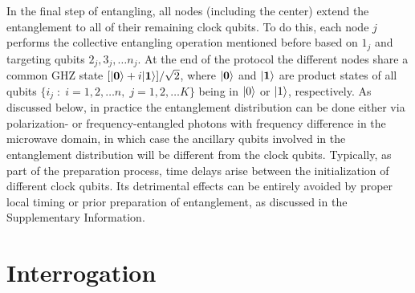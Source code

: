 In the final step of entangling, all nodes (including the center) extend the
entanglement to all of their remaining clock qubits. To do this, each node $j$
performs the collective entangling operation mentioned before based on
$1_j$ and targeting qubits $2_j, 3_j, \dots n_j$.  At the end of the protocol the different nodes share a common
GHZ state $[| \mathbf{0} \rangle + i| \mathbf{1} \rangle]/\sqrt{2}$, where
$| \mathbf{0} \rangle$ and $| \mathbf{1} \rangle$ are product states of all qubits
$\{i_j\;:\; i=1,2,\dots n,\; j=1,2,\dots K\}$ being in $| 0 \rangle$ or $| 1 \rangle$,
respectively. As discussed below, in practice the entanglement distribution can
be done  either via polarization- or frequency-entangled photons with frequency
difference in the microwave domain, in which case the ancillary qubits involved
in the entanglement distribution will be different from the clock qubits.
Typically, as part of the preparation process, time delays arise between the
initialization of different clock qubits. Its detrimental effects can be
entirely avoided by proper local timing or prior preparation of entanglement, as
discussed in the Supplementary Information.

\section{Interrogation}
\label{sec:SA}


